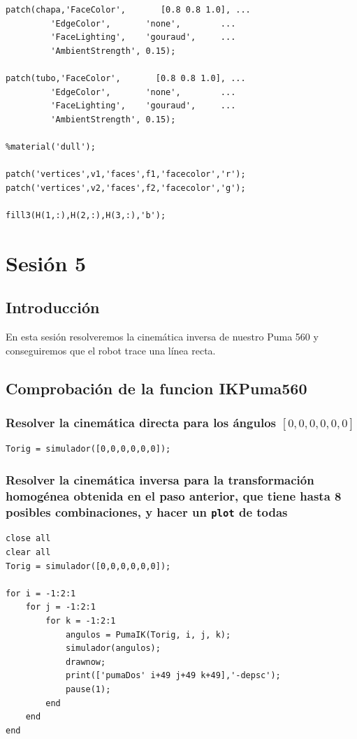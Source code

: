 \documentclass{article}
\let\oldsection\section
\renewcommand\section{\clearpage\oldsection}
\begin{document}
\begin{lstlisting}[frame=single]
patch(chapa,'FaceColor',       [0.8 0.8 1.0], ...
         'EdgeColor',       'none',        ...
         'FaceLighting',    'gouraud',     ...
         'AmbientStrength', 0.15);

patch(tubo,'FaceColor',       [0.8 0.8 1.0], ...
         'EdgeColor',       'none',        ...
         'FaceLighting',    'gouraud',     ...
         'AmbientStrength', 0.15);
     
%material('dull');

patch('vertices',v1,'faces',f1,'facecolor','r'); 
patch('vertices',v2,'faces',f2,'facecolor','g');

fill3(H(1,:),H(2,:),H(3,:),'b');
\end{lstlisting}

\section{Sesión 5}
\subsection{Introducción}
En esta sesión resolveremos la cinemática inversa de nuestro Puma 560 y conseguiremos
que el robot trace una línea recta.

\subsection{Comprobación de la funcion IKPuma560}

\subsubsection{Resolver la cinemática directa para los ángulos $[0, 0, 0, 0, 0, 0]$}
\begin{lstlisting}[frame=single]
Torig = simulador([0,0,0,0,0,0]);
\end{lstlisting}

\subsubsection{Resolver la cinemática inversa para la transformación homogénea obtenida en el paso anterior, que tiene hasta 8 posibles combinaciones, y hacer un {\tt plot} de todas}

\begin{lstlisting}[frame=single]
close all
clear all
Torig = simulador([0,0,0,0,0,0]);

for i = -1:2:1
    for j = -1:2:1
        for k = -1:2:1
            angulos = PumaIK(Torig, i, j, k);
            simulador(angulos);
            drawnow;
            print(['pumaDos' i+49 j+49 k+49],'-depsc');
            pause(1);
        end
    end
end
\end{lstlisting}
\end{document}
